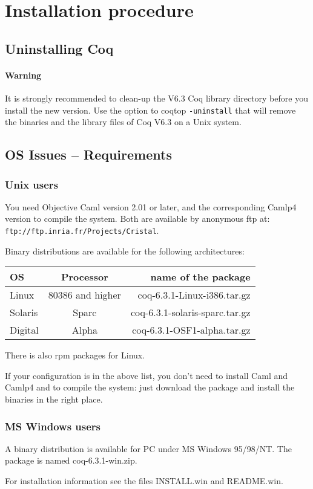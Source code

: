 \documentclass[11pt]{article}
\begin{document}
\section{Installation procedure}

\subsection{Uninstalling Coq}

\paragraph{Warning} 
It is strongly recommended to clean-up the V6.3 Coq library directory
before you install the new version.
Use the option to coqtop \texttt{-uninstall} that will remove
the binaries and the library files of Coq V6.3 on a Unix system.

\subsection{OS Issues -- Requirements}

\subsubsection{Unix users}
You need Objective Caml version 2.01 or later, and the corresponding 
Camlp4 version to compile the system. Both are available by anonymous ftp
at: \\
\verb|ftp://ftp.inria.fr/Projects/Cristal|.
\bigskip

\noindent
Binary distributions are available for the following architectures:

\bigskip
\begin{tabular}{l|c|r}
{\bf OS } & {\bf Processor} & {name of the package}\\
\hline
Linux & 80386 and higher & coq-6.3.1-Linux-i386.tar.gz \\
Solaris & Sparc & coq-6.3.1-solaris-sparc.tar.gz\\
Digital & Alpha & coq-6.3.1-OSF1-alpha.tar.gz\\
\end{tabular}
\bigskip

There is also rpm packages for Linux.

\bigskip

If your configuration is in the above list, you don't need to install
Caml and Camlp4 and to compile the system: 
just download the package and install the binaries in the right place.

\subsubsection{MS Windows users}

A binary distribution is available for PC under MS Windows 95/98/NT.
The package is named coq-6.3.1-win.zip.

For installation information see the 
files INSTALL.win and README.win.
\end{document}
